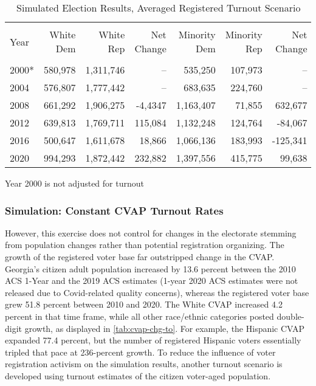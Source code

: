 \begin{table}[ht]
\centering
\begin{threeparttable}
\caption{Simulated Election Results, Averaged Registered Turnout Scenario}  
\label{tab:mid-reg-to}
\begin{tabular}{lrrrrrr}
  \hline \\ \vspace{0.5em} 
Year & White Dem & White Rep & Net Change & Minority Dem  & Minority Rep  & Net Change \vspace{0.5em} \\ 
  \hline   \\
  2000* & 580,978 & 1,311,746 &   -- & 535,250 & 107,973 &   -- \\ 
  2004 & 576,807 & 1,777,442 &   -- & 683,635 & 224,760 &   -- \\ 
  2008 & 661,292 & 1,906,275 & -4,4347 & 1,163,407 & 71,855 & 632,677 \\ 
  2012 & 639,813 & 1,769,711 & 115,084 & 1,132,248 & 124,764 & -84,067 \\ 
  2016 & 500,647 & 1,611,678 & 18,866 & 1,066,136 & 183,993 & -125,341 \\ 
  2020 & 994,293 & 1,872,442 & 232,882 & 1,397,556 & 415,775 & 99,638     \vspace{0.5em} \\ 
   \hline
\end{tabular}
{\footnotesize *Year 2000 is not adjusted for turnout}
\end{threeparttable}
\end{table}



\subsubsection{Simulation: Constant CVAP Turnout Rates}

However, this exercise does not control for changes in the electorate stemming from population changes rather than potential registration organizing. The growth of the registered voter base far outstripped change in the CVAP. Georgia's citizen adult population increased by 13.6 percent between the 2010 ACS 1-Year and the 2019 ACS estimates (1-year 2020 ACS estimates were not released due to Covid-related quality concerns), whereas the registered voter base grew 51.8 percent between 2010 and 2020. The White CVAP increased 4.2 percent in that time frame, while all other race/ethnic categories posted double-digit growth, as displayed in \ref{tab:cvap-chg-to}. For example, the Hispanic CVAP expanded 77.4 percent, but the number of registered Hispanic voters essentially tripled that pace at 236-percent growth. To reduce the influence of voter registration activism on the simulation results, another turnout scenario is developed using turnout estimates of the citizen voter-aged population.   


